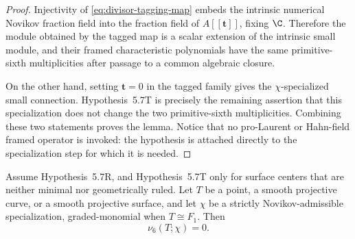 \begin{proof}
Injectivity of
\eqref{eq:divisor-tagging-map} embeds the intrinsic numerical Novikov
fraction field into the fraction field of $A[[\boldsymbol t]]$, fixing
$\C$.  Therefore the module obtained by the tagged map is a scalar extension
of the intrinsic small module, and their framed characteristic polynomials
have the same primitive-sixth multiplicities after passage to a common
algebraic closure.

On the other hand, setting $\boldsymbol t=0$ in the tagged family gives the
$\chi$-specialized small connection.  Hypothesis~5.7T is precisely the
remaining assertion that this specialization does not change the two
primitive-sixth multiplicities.  Combining these two statements proves the
lemma.  Notice that no pro-Laurent or Hahn-field framed operator is invoked:
the hypothesis is attached directly to the specialization step for which it
is needed.
\end{proof}

\begin{proposition}
\label{prop:low-dimensional-vanishing}
%
%
Assume Hypothesis~5.7R, and Hypothesis~5.7T only for surface centers that are
neither minimal nor geometrically ruled.  Let \(T\) be a point, a smooth
projective curve, or a smooth projective
surface, and let \(\chi\) be a strictly Novikov-admissible specialization,
graded-monomial when \(T\cong F_1\).  Then
\[
 \nu_6(T;\chi)=0.
 \label{eq:low-dimensional-vanishing}
\]
\end{proposition}

